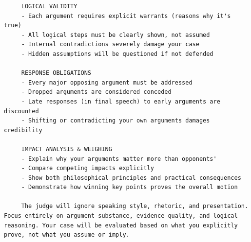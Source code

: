 \documentclass{article}
\begin{document}
\begin{verbatim}
     LOGICAL VALIDITY
     - Each argument requires explicit warrants (reasons why it's true)
     - All logical steps must be clearly shown, not assumed
     - Internal contradictions severely damage your case
     - Hidden assumptions will be questioned if not defended

     RESPONSE OBLIGATIONS
     - Every major opposing argument must be addressed
     - Dropped arguments are considered conceded
     - Late responses (in final speech) to early arguments are discounted
     - Shifting or contradicting your own arguments damages credibility

     IMPACT ANALYSIS & WEIGHING
     - Explain why your arguments matter more than opponents'
     - Compare competing impacts explicitly
     - Show both philosophical principles and practical consequences
     - Demonstrate how winning key points proves the overall motion

     The judge will ignore speaking style, rhetoric, and presentation. Focus entirely on argument substance, evidence quality, and logical reasoning. Your case will be evaluated based on what you explicitly prove, not what you assume or imply.
    \end{verbatim}
\end{document}
